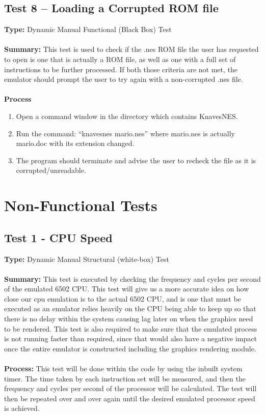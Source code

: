 \documentclass[12pt]{article}
\begin{document}
	\subsection{Test 8 – Loading a Corrupted ROM file}
		\textbf{Type: } Dynamic Manual Functional (Black Box) Test\\\\
		\textbf{Summary: } This test is used to check if the .nes ROM file the user has requested to open is one that is actually a ROM file, as well as one with a full set of instructions to be further processed. If both those criteria are not met, the emulator should prompt the user to try again with a non-corrupted .nes file.\\\\
		\textbf{Process}
			\begin{enumerate}
				\item Open a command window in the directory which contains KnavesNES.
				\item Run the command: “knavesnes mario.nes” where mario.nes is actually mario.doc with its extension changed.
				\item The program should terminate and advise the user to recheck the file as it is  corrupted/unreadable.
			\end{enumerate}
\section{Non-Functional Tests}
	\subsection{Test 1 - CPU Speed}
		\textbf{Type: } Dynamic Manual Structural (white-box) Test\\\\
		\textbf{Summary: } This test is executed by checking the frequency and cycles per second of the emulated 6502 CPU. This test will give us a more accurate idea on how close our cpu emulation is to the actual 6502 CPU, and is one that must be executed as an emulator relies heavily on the CPU being able to keep up so that there is no delay within the system causing lag later on when the graphics need to be rendered. This test is also required to make sure that the emulated process is not running faster than required, since that would also have a negative impact once the entire emulator is constructed including the graphics rendering module.\\\\
		\textbf{Process: } This test will be done within the code by using the inbuilt system timer. The time taken by each instruction set will be measured, and then the frequency and cycles per second of the processor will be calculated. The test will then be repeated over and over again until the desired emulated processor speed is achieved. 
\end{document}
